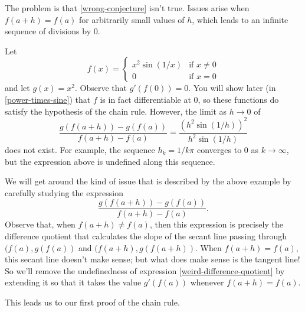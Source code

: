 The problem is that \cref{wrong-conjecture} isn't true. Issues arise when $f(a+h) = f(a)$ for arbitrarily small values of $h$, which leads to an infinite sequence of divisions by 0. 

\begin{example}
	Let \[ f(x) = \begin{cases} x^2\sin(1/x) & \text{if } x \neq 0 \\ 0 & \text{if } x = 0 \end{cases} \] and let $g(x) = x^2$. Observe that $g'(f(0)) = 0$. You will show later (in \cref{power-times-sine}) that $f$ is in fact differentiable at 0, so these functions do satisfy the hypothesis of the chain rule. However, the limit as $h \to 0$ of
	\[ \frac{g(f(a+h)) - g(f(a))}{f(a+h)-f(a)} = \frac{(h^2\sin(1/h))^2}{h^2\sin(1/h)} \]
	does not exist. For example, the sequence $h_k = 1/k\pi$ converges to 0 as $k \to \infty$, but the expression above is undefined along this sequence. 
\end{example}

We will get around the kind of issue that is described by the above example by carefully studying the expression
\begin{equation} \label{weird-difference-quotient} \frac{g(f(a+h)) - g(f(a))}{f(a+h)-f(a)}. \end{equation}
Observe that, when $f(a+h)\neq f(a)$, then this expression is precisely the difference quotient that calculates the slope of the secant line passing through $(f(a), g(f(a))$ and $(f(a+h), g(f(a+h))$. When $f(a+h) = f(a)$, this secant line doesn't make sense; but what does make sense is the tangent line! So we'll remove the undefinedness of expression \eqref{weird-difference-quotient} by extending it so that it takes the value $g'(f(a))$ whenever $f(a+h) = f(a)$. 

This leads us to our first proof of the chain rule. 

